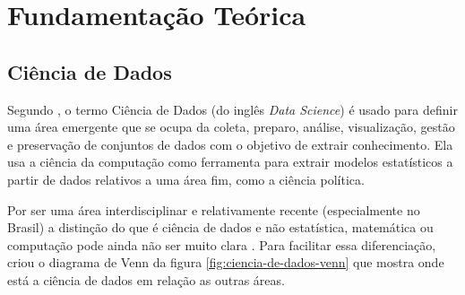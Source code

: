 \documentclass[a4paper,titlepage]{ppgi}\usepackage[]{graphicx}\usepackage[]{color}
\begin{document}
%
%






\chapter{Fundamentação Teórica}\label{cap:fundamentacao}

\section{Ciência de Dados}

Segundo , o termo Ciência de Dados (do inglês
\emph{Data Science}) é usado para definir uma área emergente que se ocupa da
coleta, preparo, análise, visualização, gestão e preservação de conjuntos de
dados com o objetivo de extrair conhecimento. Ela usa a ciência da computação
como ferramenta para extrair modelos estatísticos a partir de dados relativos a
uma área fim, como a ciência política.

Por ser uma área interdisciplinar e relativamente recente (especialmente no
Brasil) a distinção do que é ciência de dados e não estatística, matemática ou
computação pode ainda não ser muito clara \cite{Porto2014}. Para facilitar essa
diferenciação,  criou o diagrama de Venn da figura
\ref{fig:ciencia-de-dados-venn} que mostra onde está a ciência de dados em
relação as outras áreas.
\end{document}
